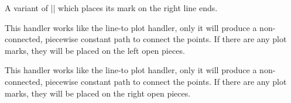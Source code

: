 \begin{command}{\pgfplothandlerconstantlinetomarkright}
A variant of |\pgfplothandlerconstantlineto| which places its mark on
the right line ends.
\begin{codeexample}[]
\end{codeexample}
\end{command}

\begin{command}{\pgfplothandlerjumpmarkleft}
  This handler works like the line-to plot handler, only it will
  produce a non-connected, piecewise constant path to connect the points. If there are any plot marks, they will be placed on the left open pieces.
\begin{codeexample}[]
\end{codeexample}
\end{command}

\begin{command}{\pgfplothandlerjumpmarkright}
  This handler works like the line-to plot handler, only it will
  produce a non-connected, piecewise constant path to connect the points. If there are any plot marks, they will be placed on the right open pieces.
\begin{codeexample}[]
\end{codeexample}
\end{command}

